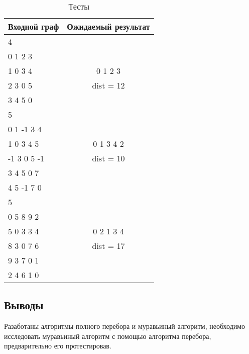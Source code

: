 \begin{table}[H]
    \caption{Тесты}
    \label{table:test}
    \centering
    \begin{tabular}{|l||c|}
        \hline
        Входной граф & Ожидаемый результат \\
        \hline
        \hline
        \hline
        4 & \\
        0 1 2 3 & \\
        1 0 3 4 & 0 1 2 3 \\
        2 3 0 5 & dist = 12 \\
        3 4 5 0 & \\
        \hline
        5 & \\
        0 1 -1 3 4 & \\
        1 0 3 4 5 & 0 1 3 4 2 \\
        -1 3 0 5 -1 & dist = 10 \\
        3 4 5 0 7 & \\
        4 5 -1 7 0 & \\
        \hline
        5 & \\
        0 5 8 9 2 & \\
        5 0 3 3 4 & 0 2 1 3 4 \\
        8 3 0 7 6 & dist = 17 \\
        9 3 7 0 1 & \\
        2 4 6 1 0 & \\
        \hline
    \end{tabular}
\end{table}

\subsection{Выводы}

Разаботаны алгоритмы полного перебора и муравьиный алгоритм, необходимо исследовать муравьиный алгоритм
с помощью алгоритма перебора, предварительно его протестировав.
